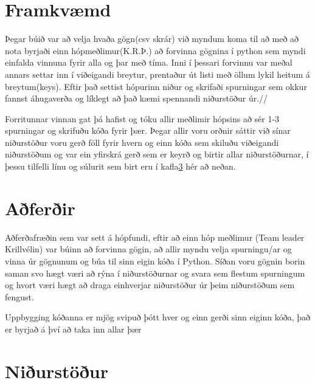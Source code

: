 \documentclass[12pt, git, draft]{rureport}
\begin{document}
\section{Framkvæmd}

Þegar búið var að velja hvaða gögn(csv skrár) við myndum koma til að með að nota byrjaði einn hópmeðlimur(K.R.Þ.) að forvinna gögnina í python sem myndi einfalda vinnuna fyrir alla og þar með tíma. Inni í þessari forvinnu var meðal annars settar inn í viðeigandi breytur, prentaður út listi með öllum lykil heitum á breytum(keys). Eftir það settist hópurinn niður og skrifaði spurningar sem okkur fannst áhugaverða og líklegt að það kæmi spennandi niðurstöður úr.//

Forritunnar vinnan gat þá hafist og tóku allir meðlimir hópsins að sér 1-3 spurningar og skrifuðu kóða fyrir þær. Þegar allir voru orðnir sáttir við sínar niðurstöður voru gerð föll fyrir hvern og einn kóða sem skiluðu viðeigandi niðurstöðum og var ein yfirskrá gerð sem er keyrð og birtir allar niðurstöðurnar, í þessu tilfelli línu og súlurit sem birt eru í kafla\ref{nidurstodur} hér að neðan.

\section{Aðferðir}

Aðferðafræðin sem var sett á hópfundi, eftir að einn hóp meðlimur (Team leader Krillvélin) var búinn að forvinna gögin, að allir myndu velja spurningu/ar og vinna úr gögnunum og búa til sinn eigin kóða í Python. Síðan voru gögnin borin saman svo hægt væri að rýna í niðurstöðurnar og svara sem flestum spurningum og hvort væri hægt að draga einhverjar niðurstöður úr þeim niðurstöðum sem fengust.

Uppbygging kóðanna er mjög svipuð þótt hver og einn gerði sinn eiginn kóða, það er byrjað á því að taka inn allar þær 
 



\section{Niðurstöður}\label{nidurstodur}
\end{document}
